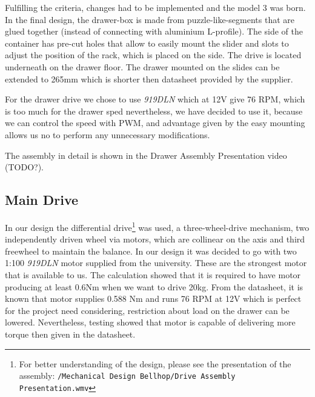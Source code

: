 \documentclass[11pt]{article}
\begin{document}
Fulfilling the criteria, changes had to be implemented and the model 3 was born. In the final design, the drawer-box is made from puzzle-like-segments that are glued together (instead of connecting with aluminium L-profile). The side of the container has pre-cut holes that allow to easily mount the slider and slots to adjust the position of the rack, which is placed on the side. The drive is located underneath on the drawer floor. The drawer mounted on the slides can be extended to 265mm which is shorter then datasheet provided by the supplier.


For the drawer drive we chose to use \textit{919DLN} which at 12V give 76 RPM, which is too much for the drawer sped nevertheless, we have decided to use it, because we can control the speed with PWM, and advantage given by the easy mounting allows us no to perform any unnecessary modifications.


The assembly in detail is shown in the Drawer Assembly Presentation video (TODO?).

\subsection*{Main Drive}

In our design the differential drive\footnote{For better understanding of the design, please see the presentation of the assembly: \texttt{/Mechanical Design Bellhop/Drive Assembly Presentation.wmv}} was used, a three-wheel-drive mechanism, two independently driven wheel via motors, which are collinear on the axis and third freewheel to maintain the balance. In our design it was decided to go with two 1:100 \textit{919DLN} motor supplied from the university. These are the strongest motor that is available to us. The calculation showed that it is required to have motor producing at least 0.6Nm when we want to drive 20kg. From the datasheet, it is known that motor supplies 0.588 Nm and runs 76 RPM at 12V which is perfect for the project need considering, restriction about load on the drawer can be lowered. Nevertheless, testing showed that motor is capable of delivering more torque then given in the datasheet.
\end{document}
